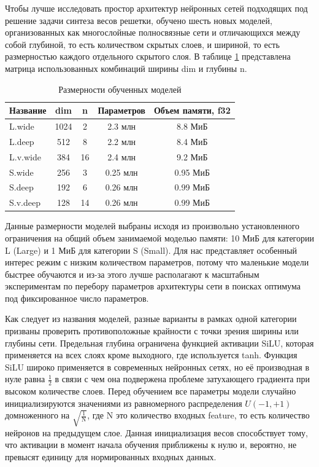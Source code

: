 \documentclass[nonacm, sigconf]{acmart}
\begin{document}
Чтобы лучше исследовать простор архитектур нейронных сетей подходящих под решение задачи синтеза весов решетки, обучено шесть новых моделей, организованных как многослойные полносвязные сети и отличающихся между собой глубиной, то есть количеством скрытых слоев, и шириной, то есть размерностью каждого отдельного скрытого слоя. В таблице \ref{our_network_size} представлена матрица использованных комбинаций ширины dim и глубины n.

\begin{table}[h]
  \centering
  \caption{Размерности обученных моделей}
  \begin{tabular}{lcccc}
  \toprule
  Название & dim & n & Параметров & Объем памяти, f32  \\
  \midrule
  L.wide & 1024 & 2 & 2.3 млн & 8.8 МиБ \\
  L.deep & 512 & 8 & 2.2 млн & 8.4 МиБ \\
  L.v.wide & 384 & 16 & 2.4 млн & 9.2 МиБ \\
  S.wide & 256 & 3 & 0.25 млн & 0.95 МиБ \\
  S.deep & 192 & 6 & 0.26 млн & 0.99 МиБ \\
  S.v.deep & 128 & 14 & 0.26 млн & 0.99 МиБ \\
  \end{tabular}
  \label{our_network_size}
\end{table}

Данные размерности моделей выбраны исходя из произвольно установленного ограничения на общий объем занимаемой моделью памяти: 10 МиБ для категории L (Large) и 1 МиБ для категории S (Small). Для нас представляет особенный интерес режим с низким количеством параметров, потому что маленькие модели быстрее обучаются и из-за этого лучше располагают к масштабным экспериментам по перебору параметров архитектуры сети в поисках оптимума под фиксированное число параметров.

Как следует из названия моделей, разные варианты в рамках одной категории призваны проверить противоположные крайности с точки зрения ширины или глубины сети. Предельная глубина ограничена функцией активации SiLU, которая применяется на всех слоях кроме выходного, где используется tanh. Функция SiLU широко применяется в современных нейронных сетях, но её производная в нуле равна $\frac{1}{2}$ в связи с чем она подвержена проблеме затухающего градиента при высоком количестве слоев. Перед обучением все параметры модели случайно инициализируются значениями из равномерного распределения $U(-1, +1)$ домноженного на $\sqrt{\frac{1}{\text{N}}}$, где N это количество входных feature, то есть количество нейронов на предыдущем слое. Данная инициализация весов способствует тому, что активации в момент начала обучения приближены к нулю и, вероятно, не превысят единицу для нормированных входных данных.
\end{document}
